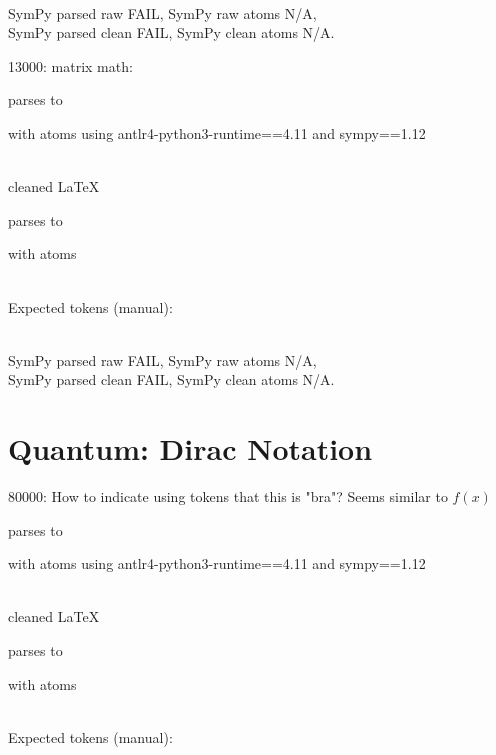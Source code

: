 \documentclass{article}
\begin{document}
\ \\
SymPy parsed raw FAIL, 
SymPy raw atoms N/A, \\
SymPy parsed clean FAIL, 
SymPy clean atoms N/A.

\hrulefill

13000:
matrix math:

parses to

with atoms
using antlr4-python3-runtime==4.11 and sympy==1.12

\ \\
cleaned \LaTeX

parses to

with atoms


\ \\
Expected tokens (manual):




\ \\
SymPy parsed raw FAIL, 
SymPy raw atoms N/A, \\
SymPy parsed clean FAIL, 
SymPy clean atoms N/A.

\hrulefill


\section{Quantum: Dirac Notation}

80000:
How to indicate using tokens that this is "bra"? Seems similar to $f(x)$


parses to

with atoms
using antlr4-python3-runtime==4.11 and sympy==1.12

\ \\
cleaned \LaTeX

parses to

with atoms


\ \\
Expected tokens (manual):

\end{document}
